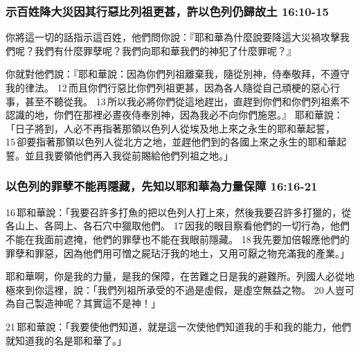 


\subsubsection{示百姓降大災因其行惡比列祖更甚，許以色列仍歸故土 16:10-15}
你將這一切的話指示這百姓，他們問你說：『耶和華為什麼說要降這大災禍攻擊我們呢？我們有什麼罪孽呢？我們向耶和華我們的神犯了什麼罪呢？』

你就對他們說：『耶和華說：因為你們列祖離棄我，隨從別神，侍奉敬拜，不遵守我的律法。 12 而且你們行惡比你們列祖更甚，因為各人隨從自己頑梗的惡心行事，甚至不聽從我。 13 所以我必將你們從這地趕出，直趕到你們和你們列祖素不認識的地，你們在那裡必晝夜侍奉別神，因為我必不向你們施恩。』
耶和華說：「日子將到，人必不再指著那領以色列人從埃及地上來之永生的耶和華起誓， 15 卻要指著那領以色列人從北方之地，並趕他們到的各國上來之永生的耶和華起誓。並且我要領他們再入我從前賜給他們列祖之地。」

\subsubsection{以色列的罪孽不能再隱藏，先知以耶和華為力量保障 16:16-21}
16 耶和華說：「我要召許多打魚的把以色列人打上來，然後我要召許多打獵的，從各山上、各岡上、各石穴中獵取他們。 17 因我的眼目察看他們的一切行為，他們不能在我面前遮掩，他們的罪孽也不能在我眼前隱藏。 18 我先要加倍報應他們的罪孽和罪惡，因為他們用可憎之屍玷汙我的地土，又用可厭之物充滿我的產業。」

耶和華啊，你是我的力量，是我的保障，在苦難之日是我的避難所。列國人必從地極來到你這裡，說：「我們列祖所承受的不過是虛假，是虛空無益之物。 20 人豈可為自己製造神呢？其實這不是神！」

21 耶和華說：「我要使他們知道，就是這一次使他們知道我的手和我的能力，他們就知道我的名是耶和華了。」













